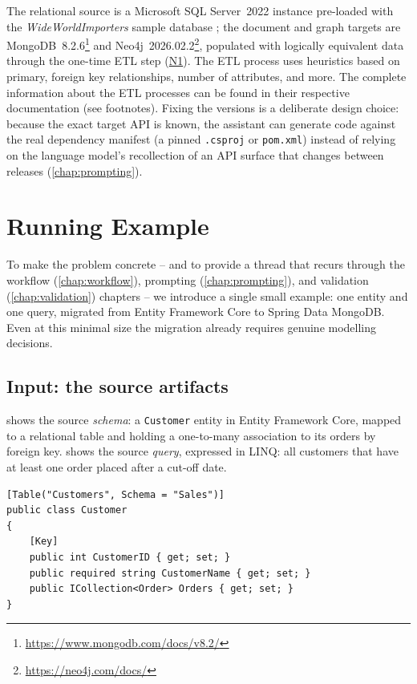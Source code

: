 The relational source is a Microsoft SQL Server~2022 instance pre-loaded with the \emph{WideWorldImporters} sample database \cite{wideWorldImporters}; the document and graph targets are MongoDB~8.2.6\footnote{\url{https://www.mongodb.com/docs/v8.2/}} and Neo4j~2026.02.2\footnote{\url{https://neo4j.com/docs/}}, populated with logically equivalent data through the one-time ETL step (\hyperref[item:non-goal-n1]{N1}). The ETL process uses heuristics based on primary, foreign key relationships, number of attributes, and more. The complete information about the ETL processes can be found in their respective documentation (see footnotes). 
Fixing the versions is a deliberate design choice: because the exact target API is known, the assistant can generate code against the real dependency manifest (a pinned \texttt{.csproj} or \texttt{pom.xml}) instead of relying on the language model's recollection of an API surface that changes between releases (\cref{chap:prompting}).

\section{Running Example}
\label{sec:problem-example}

To make the problem concrete -- and to provide a thread that recurs through the workflow (\cref{chap:workflow}), prompting (\cref{chap:prompting}), and validation (\cref{chap:validation}) chapters -- we introduce a single small example: one entity and one query, migrated from Entity Framework Core to Spring Data MongoDB. Even at this minimal size the migration already requires genuine modelling decisions.

\subsection{Input: the source artifacts}

 shows the source \emph{schema}: a \texttt{Customer} entity in Entity Framework Core, mapped to a relational table and holding a one-to-many association to its orders by foreign key.  shows the source \emph{query}, expressed in LINQ: all customers that have at least one order placed after a cut-off date.

\begin{listing}[H]
\begin{verbatim}
[Table("Customers", Schema = "Sales")]
public class Customer
{
    [Key]
    public int CustomerID { get; set; }
    public required string CustomerName { get; set; }
    public ICollection<Order> Orders { get; set; }
}
\end{verbatim}
\caption{Source schema -- an Entity Framework Core entity (LINQ source dialect).}
\label{lst:ex-source-schema}
\end{listing}

